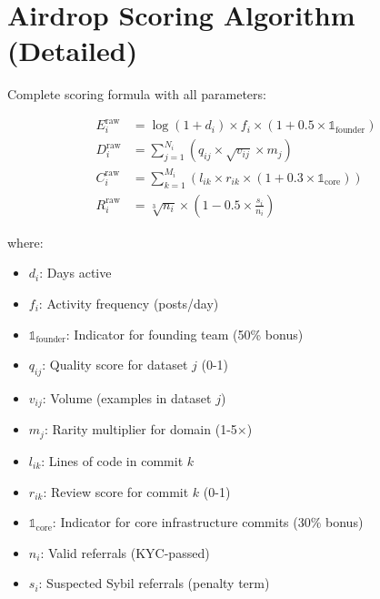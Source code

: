 \section{Airdrop Scoring Algorithm (Detailed)}


Complete scoring formula with all parameters:

\begin{align}
E_i^{\text{raw}} &= \log(1 + d_i) \times f_i \times (1 + 0.5 \times \mathbb{1}_{\text{founder}}) \\
D_i^{\text{raw}} &= \sum_{j=1}^{N_i} \left( q_{ij} \times \sqrt{v_{ij}} \times m_j \right) \\
C_i^{\text{raw}} &= \sum_{k=1}^{M_i} \left( l_{ik} \times r_{ik} \times (1 + 0.3 \times \mathbb{1}_{\text{core}}) \right) \\
R_i^{\text{raw}} &= \sqrt[3]{n_i} \times \left( 1 - 0.5 \times \frac{s_i}{n_i} \right)
\end{align}

where:
\begin{itemize}
\item $d_i$: Days active
\item $f_i$: Activity frequency (posts/day)
\item $\mathbb{1}_{\text{founder}}$: Indicator for founding team (50\% bonus)
\item $q_{ij}$: Quality score for dataset $j$ (0-1)
\item $v_{ij}$: Volume (examples in dataset $j$)
\item $m_j$: Rarity multiplier for domain (1-5×)
\item $l_{ik}$: Lines of code in commit $k$
\item $r_{ik}$: Review score for commit $k$ (0-1)
\item $\mathbb{1}_{\text{core}}$: Indicator for core infrastructure commits (30\% bonus)
\item $n_i$: Valid referrals (KYC-passed)
\item $s_i$: Suspected Sybil referrals (penalty term)
\end{itemize}

